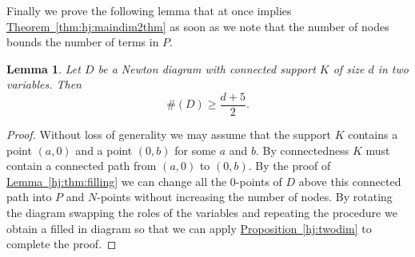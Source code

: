 \documentclass[12pt,openany]{book}
\theoremstyle{plain}
\newtheorem{lemma}[thm]{Lemma}
\theoremstyle{remark}
\theoremstyle{definition}
\theoremstyle{exercise}
\theoremstyle{example}
\newcommand{\thmref}[1]{\hyperref[#1]{Theorem~\ref*{#1}}}
\newcommand{\propref}[1]{\hyperref[#1]{Proposition~\ref*{#1}}}
\newcommand{\lemmaref}[1]{\hyperref[#1]{Lemma~\ref*{#1}}}
\begin{document}
Finally we prove the following lemma that at once implies
\thmref{thm:hj:maindim2thm} as soon as we note that the number of nodes
bounds the number of terms in $P$.

\begin{lemma}
Let $D$ be a Newton diagram with connected support $K$ of size $d$
in two variables. Then
\begin{equation}
\#(D) \geq \frac{d+5}{2}.
\end{equation}
\end{lemma}

\begin{proof}
Without loss of generality we may assume
that the support $K$ contains a point 
$(a,0)$ and a point $(0,b)$ for some $a$ and $b$.  By connectedness $K$ must
contain a connected path from $(a,0)$ to $(0,b)$.
By the proof of
\lemmaref{hj:thm:filling} we can change all the $0$-points of $D$ above this
connected path into $P$ and $N$-points without increasing the number of
nodes. By rotating the diagram swapping the roles of the variables
and repeating the procedure we obtain a filled in diagram so that
we can apply
\propref{hj:twodim} to complete the proof.
\end{proof}



\def\myDOI#1{\href{http://dx.doi.org/#1}{#1}}
\end{document}
